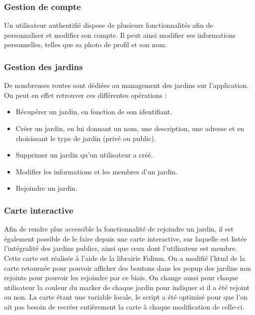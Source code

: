 \documentclass[french,a4paper]{article}
\begin{document}
\subsubsection{Gestion de compte}
Un utilisateur authentifié dispose de plusieurs fonctionnalités afin de personnaliser et modifier son compte. Il peut ainsi modifier ses informations personnelles, telles que sa photo de profil et son nom.
\subsubsection{Gestion des jardins}
De nombreuses routes sont dédiées au management des jardins sur l'application. On peut en effet retrouver ces différentes opérations :
\begin{itemize}
    \item Récupérer un jardin, en fonction de son identifiant.
    \item Créer un jardin, en lui donnant un nom, une description, une adresse et en choisissant le type de jardin (privé ou public).
    \item Supprimer un jardin qu'un utilisateur a créé.
    \item Modifier les informations et les membres d'un jardin.
    \item Rejoindre un jardin.
\end{itemize}
\subsubsection{Carte interactive}
Afin de rendre plus accessible la fonctionnalité de rejoindre un jardin, il est également possible de le faire depuis une carte interactive, sur laquelle est listée l'intégralité des jardins publics, ainsi que ceux dont l'utilisateur est membre. Cette carte est réalisée à l'aide de la librairie Folium. On a modifié l'html de la carte retournée pour pouvoir afficher des boutons dans les popup des jardins non rejoints pour pouvoir les rejoindre par ce biais. On change aussi pour chaque utilisateur la couleur du marker de chaque jardin pour indiquer si il a été rejoint ou non.
La carte étant une variable locale, le script a été optimisé pour que l'on ait pas besoin de recréer entièrement la carte à chaque modification de celle-ci.
\end{document}
